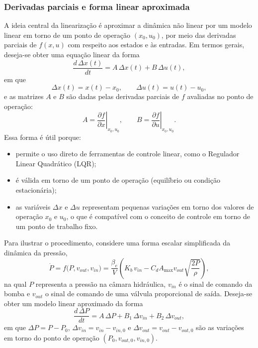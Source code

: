 \subsubsection*{Derivadas parciais e forma linear aproximada}

A ideia central da linearização é aproximar a dinâmica não linear por um modelo linear em torno de um ponto de operação $(x_0,u_0)$, por meio das derivadas parciais de $f(x,u)$ com respeito aos estados e às entradas. Em termos gerais, deseja-se obter uma equação linear da forma
\[
    \frac{d\,\Delta x(t)}{dt} = A\,\Delta x(t) + B\,\Delta u(t),
\]
em que
\[
    \Delta x(t) = x(t) - x_0, \qquad
    \Delta u(t) = u(t) - u_0,
\]
e as matrizes $A$ e $B$ são dadas pelas derivadas parciais de $f$ avaliadas no ponto de operação:
\[
    A = \left.\frac{\partial f}{\partial x}\right|_{x_0,u_0},
    \qquad
    B = \left.\frac{\partial f}{\partial u}\right|_{x_0,u_0}.
\]
Essa forma é útil porque:
\begin{itemize}
    \item permite o uso direto de ferramentas de controle linear, como o Regulador Linear Quadrático (LQR);
    \item é válida em torno de um ponto de operação (equilíbrio ou condição estacionária);
    \item as variáveis $\Delta x$ e $\Delta u$ representam pequenas variações em torno dos valores de operação $x_0$ e $u_0$, o que é compatível com o conceito de controle em torno de um ponto de trabalho fixo.
\end{itemize}

Para ilustrar o procedimento, considere uma forma escalar simplificada da dinâmica da pressão,
\[
    \dot{P} = f\big(P, v_{out}, v_{in}\big)
             = \frac{\beta_e}{V}\left( K_b\,v_{in}
               - C_d A_{\max} v_{out}\sqrt{\frac{2P}{\rho}} \right),
\]
na qual $P$ representa a pressão na câmara hidráulica, $v_{in}$ é o sinal de comando da bomba e $v_{out}$ o sinal de comando de uma válvula proporcional de saída. Deseja-se obter um modelo linear aproximado da forma
\[
    \frac{d\,\Delta P}{dt}
    = A\,\Delta P + B_1\,\Delta v_{in} + B_2\,\Delta v_{out},
\]
em que $\Delta P = P - P_0$, $\Delta v_{in} = v_{in} - v_{in,0}$ e $\Delta v_{out} = v_{out} - v_{out,0}$ são as variações em torno do ponto de operação $(P_0, v_{out,0}, v_{in,0})$.

